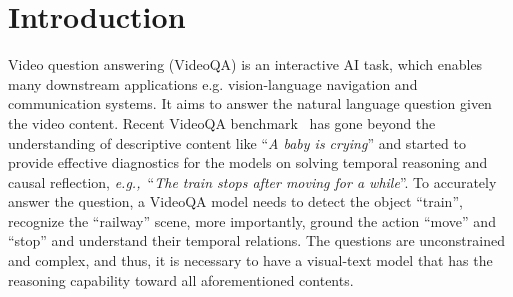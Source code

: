\documentclass[sigconf]{acmart}
\newcommand{\eg}{\emph{e.g.,~}}
\begin{document}





\maketitle



\section{Introduction}
\label{sec:intro}

Video question answering (VideoQA) is an interactive AI task, which enables many downstream applications e.g. vision-language navigation and communication systems. It aims to answer the natural language question given the video content. 
Recent VideoQA benchmark~\cite{xiao2021next} has gone beyond the understanding of descriptive content like ``\textit{A baby is crying}'' and started to provide effective diagnostics for the models on solving temporal reasoning and causal reflection, \eg ``\textit{The train stops after moving for a while}''. To accurately answer the question, a VideoQA model needs to detect the object ``train'', recognize the ``railway'' scene, more importantly, ground the action ``move'' and ``stop'' and understand their temporal relations. The questions are unconstrained and complex, and thus, it is necessary to have a visual-text model that has the reasoning capability toward all aforementioned contents. 
\end{document}

